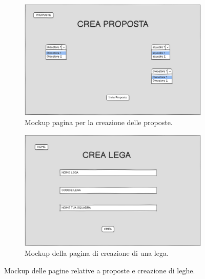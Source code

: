 \begin{figure}[H]
    \begin{subfigure}[b]{0.49\textwidth}
        \centering
        \includegraphics[width=\textwidth]{Resources/Mockups/CreaProposta.png}
        \caption{Mockup pagina per la creazione delle proposte.}
        \label{fig:pagina_crea_proposta}
    \end{subfigure}
    \hfill
    \begin{subfigure}[b]{0.49\textwidth}
        \centering
        \includegraphics[width=\textwidth]{Resources/Mockups/CreaLega.png}
        \caption{Mockup della pagina di creazione di una lega.}
        \label{fig:pagina_crea_lega}
    \end{subfigure}

    \caption{Mockup delle pagine relative a proposte e creazione di leghe.}
    \label{fig:mockup_parte3}
\end{figure}
